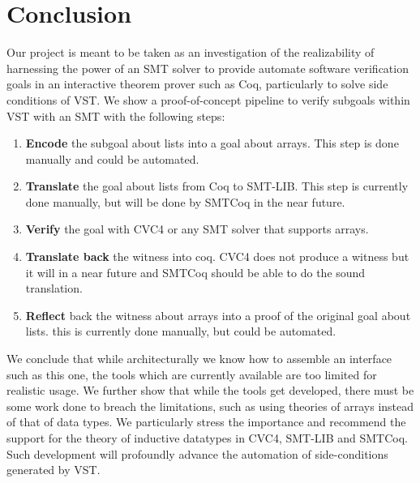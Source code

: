 \documentclass[onecolumn, preprint]{sigplanconf}
\begin{document}
\section{Conclusion}
\label{sec:conclusion}
Our project is meant to be taken as an investigation of the realizability of harnessing the power of an SMT solver to provide automate software verification goals in an interactive theorem prover such as Coq, particularly to solve side conditions of VST. We show a proof-of-concept pipeline to verify subgoals within VST with an SMT with the following steps:
\begin{enumerate}
\item \textbf{Encode} the subgoal about lists into a goal about arrays. This step is done manually and could be automated.
\item \textbf{Translate} the goal about lists from Coq to SMT-LIB. This step is currently done manually, but will be done by SMTCoq in the near future. 
\item \textbf{Verify} the goal with CVC4 or any SMT solver that supports arrays. 
\item \textbf{Translate back} the witness into coq. CVC4 does not produce a witness but it will in a near future and SMTCoq should be able to do the sound translation.
\item \textbf{Reflect} back the witness about arrays into a proof of the original goal about lists. this is currently done manually, but could be automated.
\end{enumerate}
We conclude that while architecturally we know how to assemble an interface such as this one, the tools which are currently available are too limited for realistic usage. We further show that while the tools get developed, there must be some work done to breach the limitations, such as using theories of arrays instead of that of data types. 
We particularly stress the importance and recommend the support for the theory of inductive datatypes in CVC4, SMT-LIB and SMTCoq. Such development will profoundly advance the automation of side-conditions generated by VST.

\end{document}
